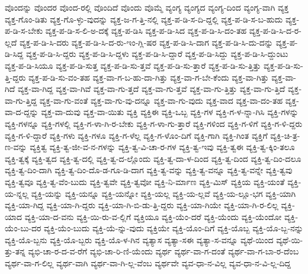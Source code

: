 {ವೊಂದನ್ನು
ವೊಂದರ
ವೊಂದ-ರಲ್ಲಿ
ವೊಂದಿದೆ
ವೊಂದು
ವೊಮ್ಮೆ
ವ್ಯಂಗ್ಯ
ವ್ಯಂಗ್ಯದ
ವ್ಯಂಗ್ಯ-ದಿಂದ
ವ್ಯಂಗ್ಯ-ವಾಗಿ
ವ್ಯಕ್ತ
ವ್ಯಕ್ತ-ಗೊಂ-ಡಿತು
ವ್ಯಕ್ತ-ಗೊ-ಳ್ಳು-ವುದನ್ನು
ವ್ಯಕ್ತ-ಜ-ಗ-ತ್ತಿ-ನಲ್ಲಿ
ವ್ಯಕ್ತ-ಪ-ಡಿ-ಸ-ದಿ-ದ್ದಲ್ಲಿ
ವ್ಯಕ್ತ-ಪ-ಡಿ-ಸ-ಬ-ಹುದು
ವ್ಯಕ್ತ-ಪ-ಡಿ-ಸ-ಬೇಕು
ವ್ಯಕ್ತ-ಪ-ಡಿ-ಸ-ಲಿ-ಅ-ದಕ್ಕೆ
ವ್ಯಕ್ತ-ಪ-ಡಿಸಿ
ವ್ಯಕ್ತ-ಪ-ಡಿ-ಸಿದ
ವ್ಯಕ್ತ-ಪ-ಡಿ-ಸಿ-ದಂ-ತಹ
ವ್ಯಕ್ತ-ಪ-ಡಿ-ಸಿ-ದ-ರ-ಲ್ಲದೆ
ವ್ಯಕ್ತ-ಪ-ಡಿ-ಸಿ-ದರು
ವ್ಯಕ್ತ-ಪ-ಡಿ-ಸಿ-ದ-ರು-ಇಂ-ಗ್ಲಿ-ಷರ
ವ್ಯಕ್ತ-ಪ-ಡಿ-ಸಿ-ದಾಗ
ವ್ಯಕ್ತ-ಪ-ಡಿ-ಸಿ-ದು-ದನ್ನು
ವ್ಯಕ್ತ-ಪ-ಡಿ-ಸಿದ್ದ
ವ್ಯಕ್ತ-ಪ-ಡಿ-ಸಿ-ದ್ದರು
ವ್ಯಕ್ತ-ಪ-ಡಿ-ಸಿ-ದ್ದಳು
ವ್ಯಕ್ತ-ಪ-ಡಿ-ಸಿ-ದ್ದಾರೆ
ವ್ಯಕ್ತ-ಪ-ಡಿ-ಸಿದ್ದು
ವ್ಯಕ್ತ-ಪ-ಡಿ-ಸಿ-ದ್ದುಂಟು
ವ್ಯಕ್ತ-ಪ-ಡಿ-ಸಿಯೂ
ವ್ಯಕ್ತ-ಪ-ಡಿ-ಸುತ್ತ
ವ್ಯಕ್ತ-ಪ-ಡಿ-ಸು-ತ್ತವೆ
ವ್ಯಕ್ತ-ಪ-ಡಿ-ಸು-ತ್ತಾರೆ
ವ್ಯಕ್ತ-ಪ-ಡಿ-ಸು-ತ್ತಿತ್ತು
ವ್ಯಕ್ತ-ಪ-ಡಿ-ಸು-ತ್ತಿ-ದ್ದರು
ವ್ಯಕ್ತ-ಪ-ಡಿ-ಸು-ವಂ-ತಹ
ವ್ಯಕ್ತ-ವಾ-ಗ-ಬ-ಹು-ದಾ-ಗಿತ್ತು
ವ್ಯಕ್ತ-ವಾ-ಗ-ಬೇ-ಕೆಂದು
ವ್ಯಕ್ತ-ವಾ-ಗಿತ್ತು
ವ್ಯಕ್ತ-ವಾ-ಗಿದೆ
ವ್ಯಕ್ತ-ವಾ-ಗಿದ್ದ
ವ್ಯಕ್ತ-ವಾ-ಗಿವೆ
ವ್ಯಕ್ತ-ವಾ-ಗು-ತ್ತದೆ
ವ್ಯಕ್ತ-ವಾ-ಗು-ತ್ತವೆ
ವ್ಯಕ್ತ-ವಾ-ಗು-ತ್ತಿತ್ತು
ವ್ಯಕ್ತ-ವಾ-ಗು-ತ್ತಿದೆ
ವ್ಯಕ್ತ-ವಾ-ಗು-ತ್ತಿದ್ದ
ವ್ಯಕ್ತ-ವಾ-ಗು-ವಂತೆ
ವ್ಯಕ್ತ-ವಾ-ಗು-ವು-ದನ್ನೂ
ವ್ಯಕ್ತ-ವಾ-ಗು-ವುದು
ವ್ಯಕ್ತ-ವಾದ
ವ್ಯಕ್ತ-ವಾ-ದಂ-ತಹ
ವ್ಯಕ್ತ-ವಾ-ದ-ದ್ದನ್ನು
ವ್ಯಕ್ತ-ವಾ-ದುವು
ವ್ಯಕ್ತ-ವಾ-ಯಿತು
ವ್ಯಕ್ತಿ
ವ್ಯಕ್ತಿಈ
ವ್ಯಕ್ತಿ-ಒಬ್ಬ
ವ್ಯಕ್ತಿ-ಗಳ
ವ್ಯಕ್ತಿ-ಗ-ಳ-ನ್ನಾ-ಗಿಸಿ
ವ್ಯಕ್ತಿ-ಗಳನ್ನು
ವ್ಯಕ್ತಿ-ಗಳನ್ನೂ
ವ್ಯಕ್ತಿ-ಗಳಲ್ಲಿ
ವ್ಯಕ್ತಿ-ಗ-ಳಾ-ಗಿ-ರ-ಬೇಕು
ವ್ಯಕ್ತಿ-ಗ-ಳಾ-ಗು-ತ್ತಾರೆ
ವ್ಯಕ್ತಿ-ಗಳಿಂದ
ವ್ಯಕ್ತಿ-ಗ-ಳಿಗೆ
ವ್ಯಕ್ತಿ-ಗ-ಳಿ-ದ್ದರು
ವ್ಯಕ್ತಿ-ಗ-ಳಿ-ದ್ದಾರೆ
ವ್ಯಕ್ತಿ-ಗಳು
ವ್ಯಕ್ತಿ-ಗಳೂ
ವ್ಯಕ್ತಿ-ಗ-ಳೆಲ್ಲ
ವ್ಯಕ್ತಿ-ಗ-ಳೊಂ-ದಿಗೆ
ವ್ಯಕ್ತಿ-ಗಾಗಿ
ವ್ಯಕ್ತಿ-ಗಿಂತ
ವ್ಯಕ್ತಿಗೆ
ವ್ಯಕ್ತಿ-ಚಿ-ತ್ರ-ಣ-ವನ್ನು
ವ್ಯಕ್ತಿತ್ವ
ವ್ಯಕ್ತಿ-ತ್ವ-ಜೀ-ವ-ನ-ಗಳನ್ನು
ವ್ಯಕ್ತಿ-ತ್ವ-ವಿ-ಚಾ-ರ-ಗಳ
ವ್ಯಕ್ತಿ-ತ್ವ-ಇವು
ವ್ಯಕ್ತಿ-ತ್ವಈ
ವ್ಯಕ್ತಿ-ತ್ವ-ಕ್ಕಿಂ-ತಲೂ
ವ್ಯಕ್ತಿ-ತ್ವಕ್ಕೆ
ವ್ಯಕ್ತಿ-ತ್ವದ
ವ್ಯಕ್ತಿ-ತ್ವ-ದಲ್ಲಿ
ವ್ಯಕ್ತಿ-ತ್ವ-ದ-ಲ್ಲೊಂದು
ವ್ಯಕ್ತಿ-ತ್ವ-ದಾ-ಳ-ದಿಂದ
ವ್ಯಕ್ತಿ-ತ್ವ-ದಿಂದ
ವ್ಯಕ್ತಿ-ತ್ವ-ದಿಂ-ದಲೂ
ವ್ಯಕ್ತಿ-ತ್ವ-ದಿಂ-ದಾಗಿ
ವ್ಯಕ್ತಿ-ತ್ವ-ದಿಂ-ದೊ-ಡ-ಗೂ-ಡಿ-ದಾಗ
ವ್ಯಕ್ತಿ-ತ್ವ-ವನ್ನು
ವ್ಯಕ್ತಿ-ತ್ವ-ವನ್ನೂ
ವ್ಯಕ್ತಿ-ತ್ವ-ವನ್ನೇ
ವ್ಯಕ್ತಿ-ತ್ವವು
ವ್ಯಕ್ತಿ-ತ್ವವೂ
ವ್ಯಕ್ತಿ-ತ್ವ-ವೆಂ-ಬುದು
ವ್ಯಕ್ತಿ-ತ್ವವೇ
ವ್ಯಕ್ತಿ-ತ್ವವೋ
ವ್ಯಕ್ತಿ-ನಿ-ರ್ಮಾಣ
ವ್ಯಕ್ತಿ-ಮಿಸ್
ವ್ಯಕ್ತಿಯ
ವ್ಯಕ್ತಿ-ಯಂತೆ
ವ್ಯಕ್ತಿ-ಯ-ನ್ನಲ್ಲ
ವ್ಯಕ್ತಿ-ಯನ್ನು
ವ್ಯಕ್ತಿ-ಯನ್ನೂ
ವ್ಯಕ್ತಿ-ಯನ್ನೋ
ವ್ಯಕ್ತಿ-ಯಲ್ಲ
ವ್ಯಕ್ತಿ-ಯ-ಲ್ಲವೆ
ವ್ಯಕ್ತಿ-ಯ-ಲ್ಲೂ-ಭಗ
ವ್ಯಕ್ತಿ-ಯಾಗಿ
ವ್ಯಕ್ತಿ-ಯಾ-ಗಿದ್ದ
ವ್ಯಕ್ತಿ-ಯಾ-ಗಿ-ದ್ದರು
ವ್ಯಕ್ತಿ-ಯಾ-ಗಿ-ಬಿ-ಡು-ತ್ತಿ-ದ್ದರು
ವ್ಯಕ್ತಿ-ಯಾ-ಗಿಯೇ
ವ್ಯಕ್ತಿ-ಯಾ-ಗಿ-ರ-ಲಿಲ್ಲ
ವ್ಯಕ್ತಿ-ಯಾದ
ವ್ಯಕ್ತಿ-ಯಾ-ದ-ವನು
ವ್ಯಕ್ತಿ-ಯಿ-ರು-ವ-ಲ್ಲಿಗೆ
ವ್ಯಕ್ತಿಯೂ
ವ್ಯಕ್ತಿ-ಯೆಂ-ದರೆ
ವ್ಯಕ್ತಿ-ಯೆಂದು
ವ್ಯಕ್ತಿ-ಯೆಂದೋ
ವ್ಯಕ್ತಿ-ಯೆಂ-ಬು-ದರ
ವ್ಯಕ್ತಿ-ಯೆಂ-ಬುದು
ವ್ಯಕ್ತಿ-ಯೆ-ನ್ನು-ವುದು
ವ್ಯಕ್ತಿಯೇ
ವ್ಯಕ್ತಿ-ಯೊಂ-ದಿಗೆ
ವ್ಯಕ್ತಿ-ಯೊಬ್ಬ
ವ್ಯಕ್ತಿ-ಯೊ-ಬ್ಬ-ನನ್ನು
ವ್ಯಕ್ತಿ-ಯೊ-ಬ್ಬನು
ವ್ಯಕ್ತಿ-ಯೊ-ಬ್ಬರು
ವ್ಯಕ್ತಿ-ಯೊ-ಳ-ಗಿನ
ವ್ಯತ್ಯಾಸ
ವ್ಯತ್ಯಾ-ಸಈ
ವ್ಯತ್ಯಾ-ಸ-ವನ್ನೂ
ವ್ಯಥೆ-ಯಿಂದ
ವ್ಯಥೆ-ಯಿ-ತ್ತು-ತನ್ನ
ವ್ಯಭಿ-ಚಾ-ರ-ದ-ವ-ರೆಗೆ
ವ್ಯಭಿ-ಚಾ-ರಿ-ಣಿ-ಯೆಂದು
ವ್ಯರ್ಥ
ವ್ಯರ್ಥ-ವಾ-ಗ-ದಂತೆ
ವ್ಯರ್ಥ-ವಾ-ಗ-ಬಾ-ರ-ದೆಂಬ
ವ್ಯರ್ಥ-ವಾ-ಗ-ಲಿಲ್ಲ
ವ್ಯರ್ಥ-ವಾಗಿ
ವ್ಯರ್ಥ-ವಾ-ಗಿ-ಲ್ಲ-ವೆಂಬ
ವ್ಯರ್ಥವೇ
ವ್ಯವ-ಧಾ-ನ-ವಿಲ್ಲ
ವ್ಯವ-ಧಾ-ನ-ವಿ-ಲ್ಲ-ದಿದ್ದ
}
